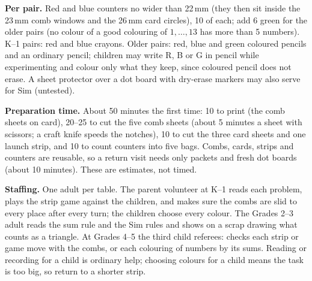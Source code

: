 \documentclass[11pt]{article}
\begin{document}
\textbf{Per pair.} Red and blue counters no wider than 22\,mm (they then sit inside the 23\,mm comb windows and the 26\,mm card circles), 10 of each; add 6 green for the older pairs (no colour of a good colouring of $1,\dots,13$ has more than 5 numbers). K--1 pairs: red and blue crayons. Older pairs: red, blue and green coloured pencils and an ordinary pencil; children may write R, B or G in pencil while experimenting and colour only what they keep, since coloured pencil does not erase. A sheet protector over a dot board with dry-erase markers may also serve for Sim (untested).

\textbf{Preparation time.} About 50 minutes the first time: 10 to print (the comb sheets on card), 20--25 to cut the five comb sheets (about 5 minutes a sheet with scissors; a craft knife speeds the notches), 10 to cut the three card sheets and one launch strip, and 10 to count counters into five bags. Combs, cards, strips and counters are reusable, so a return visit needs only packets and fresh dot boards (about 10 minutes). These are estimates, not timed.

\textbf{Staffing.} One adult per table. The parent volunteer at K--1 reads each problem, plays the strip game against the children, and makes sure the combs are slid to every place after every turn; the children choose every colour. The Grades 2--3 adult reads the sum rule and the Sim rules and shows on a scrap drawing what counts as a triangle. At Grades 4--5 the third child referees: checks each strip or game move with the combs, or each colouring of numbers by its sums. Reading or recording for a child is ordinary help; choosing colours for a child means the task is too big, so return to a shorter strip.
\end{document}
